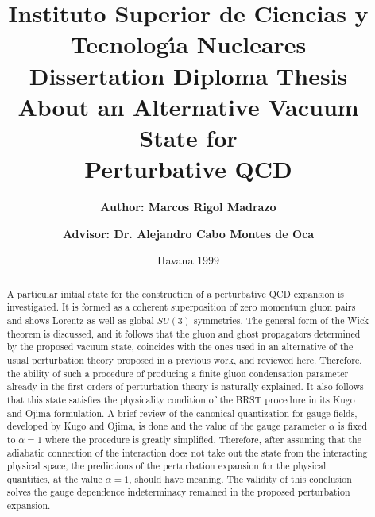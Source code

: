 \documentclass[12pt,letterpaper]{report}
\begin{document}
\title{Instituto Superior de Ciencias y Tecnolog\'{\i}a Nucleares \\
\vspace{2cm} Dissertation Diploma Thesis \\ \vspace{2.5cm} {\bf
About an Alternative Vacuum State for \\ Perturbative QCD \\
 \vspace{1.7cm}}}

\author{{\bf Author: Marcos Rigol Madrazo} \\ \vspace{0.1cm} \and 
{\bf Advisor: Dr. Alejandro Cabo Montes de Oca}}

\date{\vspace{1cm} Havana 1999}

\maketitle

\begin{abstract}

A particular initial state for the construction of a perturbative
QCD expansion is investigated. It is formed as a coherent
superposition of zero momentum gluon pairs and shows Lorentz as
well as global $SU(3)$ symmetries. The general form of the Wick
theorem is discussed, and it follows that the gluon and ghost
propagators determined by the proposed vacuum state, coincides
with the ones used in an alternative of the usual perturbation
theory proposed in a previous work, and reviewed here. Therefore,
the ability of such a procedure of producing a finite gluon
condensation parameter already in the first orders of perturbation
theory is naturally explained. It also follows that this state
satisfies the physicality condition of the BRST procedure in its
Kugo and Ojima formulation. A brief review of the canonical
quantization for gauge fields, developed by Kugo and Ojima, is
done and the value of the gauge parameter $\alpha$ is fixed to
$\alpha=1$ where the procedure is greatly simplified. Therefore,
after assuming that the adiabatic connection of the interaction
does not take out the state from the interacting physical space,
the predictions of the perturbation expansion for the physical
quantities, at the value $\alpha=1$, should have meaning. The
validity of this conclusion solves the gauge dependence
indeterminacy remained in the proposed perturbation expansion.

\end{abstract}
\end{document}
